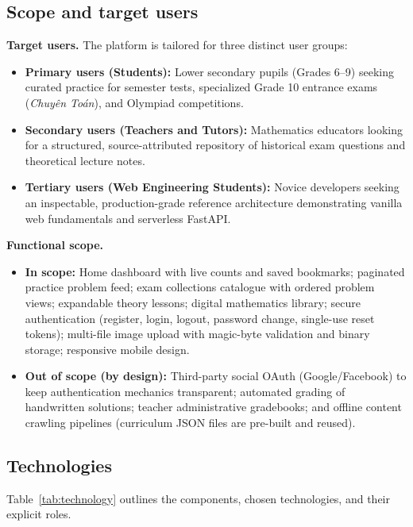 \subsection{Scope and target users}
\textbf{Target users.}
The platform is tailored for three distinct user groups:
\begin{itemize}
  \item \textbf{Primary users (Students):} Lower secondary pupils (Grades 6--9) seeking curated practice
        for semester tests, specialized Grade 10 entrance exams (\textit{Chuyên Toán}), and Olympiad competitions.
  \item \textbf{Secondary users (Teachers and Tutors):} Mathematics educators looking for a structured,
        source-attributed repository of historical exam questions and theoretical lecture notes.
  \item \textbf{Tertiary users (Web Engineering Students):} Novice developers seeking an inspectable,
        production-grade reference architecture demonstrating vanilla web fundamentals and serverless FastAPI.
\end{itemize}

\textbf{Functional scope.}
\begin{itemize}
  \item \textbf{In scope:} Home dashboard with live counts and saved bookmarks; paginated practice problem feed;
        exam collections catalogue with ordered problem views; expandable theory lessons; digital mathematics
        library; secure authentication (register, login, logout, password change, single-use reset tokens);
        multi-file image upload with magic-byte validation and binary storage; responsive mobile design.
  \item \textbf{Out of scope (by design):} Third-party social OAuth (Google/Facebook) to keep authentication
        mechanics transparent; automated grading of handwritten solutions; teacher administrative gradebooks;
        and offline content crawling pipelines (curriculum JSON files are pre-built and reused).
\end{itemize}

\subsection{Technologies}
Table~\ref{tab:technology} outlines the components, chosen technologies, and their explicit roles.


